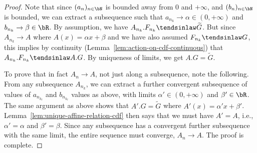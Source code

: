\begin{proof}
  Note that since $(a_n)_{n \in \bN}$ is bounded away from $0$ and $+\infty$,
  and $(b_n)_{n \in \bN}$ is bounded, we can extract a subsequence such that
  $a_{n_k} \to \alpha \in (0,+\infty)$ and $b_{n_k} \to \beta \in \bR$.
  By assumption, we have $A_{n_k} . F_{n_k} \tendsinlaw \widetilde{G}$.
  But since $A_{n_k} \to A$ where $A(x) = \alpha x + \beta$
  and we have also assumed $F_{n_k} \tendsinlaw G$, this implies by
  continuity (Lemma~\ref{lem:action-on-cdf-continuous}) that $A_{n_k} . F_{n_k} \tendsinlaw A . G$.
  By uniqueness of limits, we get $A . G = \widetilde{G}$.

  To prove that in fact $A_n \to A$, not just along a subsequence, note the
  following. From any subsequence $A_{n_k}$, we can extract a further
  convergent subsequence of values of $a_{n_{k_\ell}}$ and $b_{n_{k_\ell}}$
  values as above, with limits $\alpha' \in (0,+\infty)$
  and $\beta' \in \bR$. The same argument as above shows that
  $A' . G = \widetilde{G}$ where $A'(x) = \alpha' x + \beta'$.
  Lemma~\ref{lem:unique-affine-relation-cdf} then says that we must have
  $A' = A$, i.e., $\alpha' = \alpha$ and $\beta' = \beta$. Since any
  subsequence has a convergent further subsequence with the same limit,
  the entire sequence must converge, $A_n \to A$.
  The proof is complete.
\end{proof}

